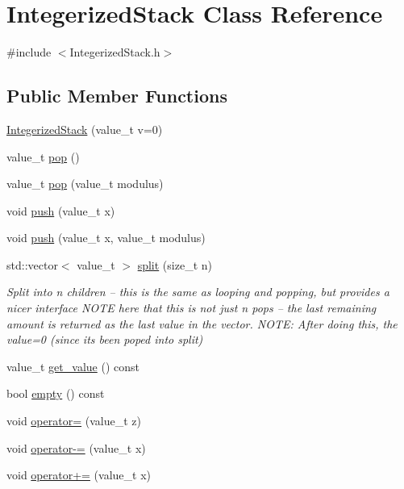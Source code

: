 \hypertarget{class_integerized_stack}{}\section{Integerized\+Stack Class Reference}
\label{class_integerized_stack}


{\ttfamily \#include $<$Integerized\+Stack.\+h$>$}

\subsection*{Public Member Functions}
\begin{DoxyCompactItemize}
\item 
\hyperlink{class_integerized_stack_a46b24ace7ea983bfabaa437932111440}{Integerized\+Stack} (value\+\_\+t v=0)
\item 
value\+\_\+t \hyperlink{class_integerized_stack_a5edd593c74341341cc6f8e41e0f14bdf}{pop} ()
\item 
value\+\_\+t \hyperlink{class_integerized_stack_a713da8c8102cb5a53ec3ad87fada36f5}{pop} (value\+\_\+t modulus)
\item 
void \hyperlink{class_integerized_stack_a721481e52e56398bee39edf6a3d2ff80}{push} (value\+\_\+t x)
\item 
void \hyperlink{class_integerized_stack_affd28eb928362de80e35cd4e1ecdf96b}{push} (value\+\_\+t x, value\+\_\+t modulus)
\item 
std\+::vector$<$ value\+\_\+t $>$ \hyperlink{class_integerized_stack_a683c0c4d78ebea10a822aeaaaef5349e}{split} (size\+\_\+t n)
\begin{DoxyCompactList}\small\item\em Split into n children -- this is the same as looping and popping, but provides a nicer interface N\+O\+TE here that this is {\itshape not} just n pops -- the last remaining amount is returned as the last value in the vector. N\+O\+TE\+: After doing this, the value=0 (since it\textquotesingle{}s been poped into split) \end{DoxyCompactList}\item 
value\+\_\+t \hyperlink{class_integerized_stack_aedecc57b1bbb2c056f57a00ec6eea2e3}{get\+\_\+value} () const
\item 
bool \hyperlink{class_integerized_stack_a549d4ed66e89d2e3d7e726d5c8e28fa2}{empty} () const
\item 
void \hyperlink{class_integerized_stack_a829e18dc8bae3eb371e9822271102a2d}{operator=} (value\+\_\+t z)
\item 
void \hyperlink{class_integerized_stack_ac2ec311399b327573a2c0f19d2a902a4}{operator-\/=} (value\+\_\+t x)
\item 
void \hyperlink{class_integerized_stack_a70df05b936e94c717584290d0c457cca}{operator+=} (value\+\_\+t x)
\end{DoxyCompactItemize}

